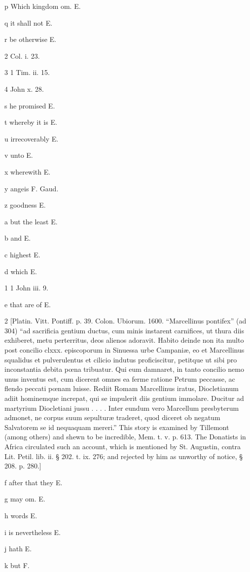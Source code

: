 p
Which kingdom om. E.

q
it shall not E.

r
be otherwise E.

2
Col. i. 23.

3
1 Tim. ii. 15.

4
John x. 28.

s
he promised E.

t
whereby it is E.

u
irrecoverably E.

v
unto E.

x
wherewith E.

y
angeis F. Gaud.

z
goodness E.

a
but the least E.

b
and E.

c
highest E.

d
which E.

1
1 John iii. 9.

e
that are of E.

2
[Platin. Vitt. Pontiff. p. 39. Colon. Ubiorum. 1600. “Marcellinus pontifex” (ad 304) “ad sacrificia gentium ductus, cum minis instarent carnifices, ut thura diis exhiberet, metu perterritus, deos alienos adoravit. Habito deinde non ita multo post concilio clxxx. episcoporum in Sinuessa urbe Campaniæ, eo et Marcellinus squalidus et pulverulentus et cilicio indutus proficiscitur, petitque ut sibi pro inconstantia debita pœna tribuatur. Qui eum damnaret, in tanto concilio nemo unus inventus est, cum dicerent omnes ea ferme ratione Petrum peccasse, ac flendo peccati pœnam luisse. Rediit Romam Marcellinus iratus, Diocletianum adiit hominemque increpat, qui se impulerit diis gentium immolare. Ducitur ad martyrium Diocletiani jussu . . . . Inter eundum vero Marcellum presbyterum admonet, ne corpus suum sepulturæ traderet, quod diceret ob negatum Salvatorem se id nequaquam mereri.” This story is examined by Tillemont (among others) and shewn to be incredible, Mem. t. v. p. 613. The Donatists in Africa circulated such an account, which is mentioned by St. Augustin, contra Lit. Petil. lib. ii. § 202. t. ix. 276; and rejected by him as unworthy of notice, § 208. p. 280.]

f
after that they E.

g
may om. E.

h
words E.

i
is nevertheless E.

j
hath E.

k
but F.

